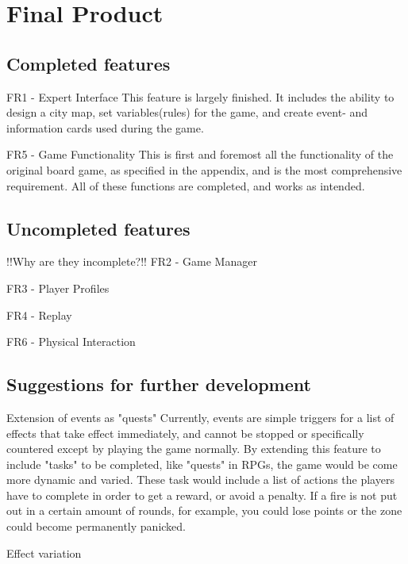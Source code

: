 \chapter{Final Product}

\section{Completed features}
FR1 - Expert Interface
This feature is largely finished. It includes the ability to design a city map, set variables(rules) for the game, and create event- and information cards used during the game.

FR5 - Game Functionality
This is first and foremost all the functionality of the original board game, as specified in the appendix, and is the most comprehensive requirement. All of these functions are completed, and works as intended.



\section{Uncompleted features}

!!Why are they incomplete?!!
FR2 - Game Manager

FR3 - Player Profiles

FR4 - Replay

FR6 - Physical Interaction


\section{Suggestions for further development}

Extension of events as "quests"
Currently, events are simple triggers for a list of effects that take effect immediately, and cannot be stopped or specifically countered except by playing the game normally. By extending this feature to include "tasks" to be completed, like "quests" in RPGs, the game would be come more dynamic and varied. These task would include a list of actions the players have to complete in order to get a reward, or avoid a penalty. If a fire is not put out in a certain amount of rounds, for example, you could lose points or the zone could become permanently panicked.

Effect variation





